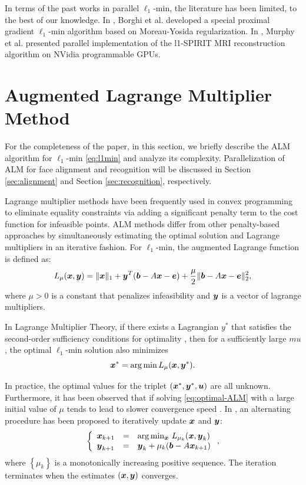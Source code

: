 \documentclass[10pt,twocolumn,letterpaper]{article}
\begin{document}
In terms of the past works in parallel $\ell_1$-min, the literature has been
limited, to the best of our knowledge. In \cite{BorghiA2010}, Borghi et al.
developed a special proximal gradient $\ell_1$-min algorithm based on
Moreau-Yosida regularization. In \cite{MurphyM2010}, Murphy et al. presented
parallel implementation of the l1-SPIRIT MRI reconstruction algorithm on NVidia
programmable GPUs.

\section{Augmented Lagrange Multiplier Method}
\label{sec:ALM}

For the completeness of the paper, in this section, we briefly describe the ALM
algorithm for $\ell_1$-min \eqref{eq:l1min} \cite{YangA2010-ICIP} and analyze
its complexity. Parallelization of ALM for face alignment and recognition will
be discussed in Section \ref{sec:alignment} and Section \ref{sec:recognition},
respectively.

Lagrange multiplier methods have been frequently used in convex programming to
eliminate equality constraints via adding a significant penalty term to the
cost function for infeasible points. ALM methods differ from other
penalty-based approaches by simultaneously estimating the optimal solution and
Lagrange multipliers in an iterative fashion.  For $\ell_1$-min, the augmented
Lagrange function is defined as: \begin{equation} L_\mu({\boldsymbol{x}},{\boldsymbol{y}}) = \|{\boldsymbol{x}}\|_1 +
{\boldsymbol{y}}^T({\boldsymbol{b}} - A{\boldsymbol{x}} - {\boldsymbol{e}}) + \frac{\mu}{2} \| {\boldsymbol{b}}-A{\boldsymbol{x}}-{\boldsymbol{e}} \|_2^2, \end{equation}
where $\mu > 0$ is a constant that penalizes infeasibility and ${\boldsymbol{y}}$ is a
vector of lagrange multipliers.

In Lagrange Multiplier Theory, if there exists a Lagrangian $y^*$ that
satisfies the second-order sufficiency conditions for optimality
\cite{BertsekasD2003}, then for a sufficiently large $mu$, the optimal
$\ell_1$-min solution also minimizes
\begin{equation}
{\boldsymbol{x}}^* = \arg \min L_\mu({\boldsymbol{x}},{\boldsymbol{y}}^*).
\label{eq:optimal-ALM}
\end{equation}

In practice, the optimal values for the triplet $({\boldsymbol{x}}^*, {\boldsymbol{y}}^*, {\boldsymbol{u}})$ are all
unknown. Furthermore, it has been observed that if solving
\eqref{eq:optimal-ALM} with a large initial value of $\mu$ tends to lead to
slower convergence speed \cite{WrightS2008,YangA2010-ICIP}. In
\cite{BertsekasD2003,YangJ2009}, an alternating procedure has been proposed to
iteratively update ${\boldsymbol{x}}$ and ${\boldsymbol{y}}$:
\begin{equation}
\left \{
\begin{array}{lll}
{\boldsymbol{x}}_{k+1} & = & \arg\min_{{\boldsymbol{x}}} \, L_{\mu_k} ({\boldsymbol{x}},{\boldsymbol{y}}_k)\\
{\boldsymbol{y}}_{k+1} & = & {\boldsymbol{y}}_k + \mu_k ({\boldsymbol{b}} - A{\boldsymbol{x}}_{k+1}) \\
\end{array}
\right . ,
\label{eq:alm}
\end{equation}
where $\left\{\mu_{k}\right\}$ is a monotonically increasing positive sequence.
The iteration terminates when the estimates $({\boldsymbol{x}}, {\boldsymbol{y}})$ converges.
\end{document}
